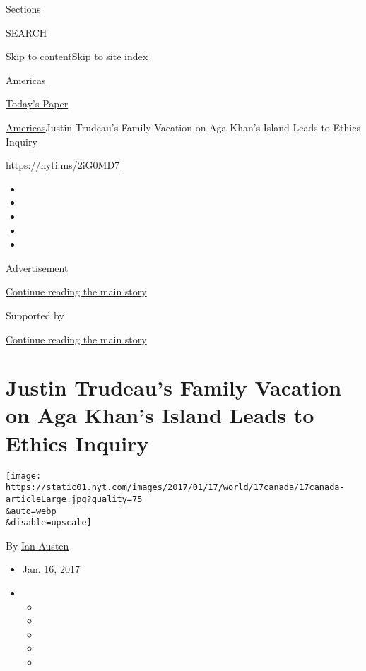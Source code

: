 Sections

SEARCH

\protect\hyperlink{site-content}{Skip to
content}\protect\hyperlink{site-index}{Skip to site index}

\href{https://www.nytimes.com/section/world/americas}{Americas}

\href{https://myaccount.nytimes.com/auth/login?response_type=cookie\&client_id=vi}{}

\href{https://www.nytimes.com/section/todayspaper}{Today's Paper}

\href{/section/world/americas}{Americas}\textbar{}Justin Trudeau's
Family Vacation on Aga Khan's Island Leads to Ethics Inquiry

\url{https://nyti.ms/2iG0MD7}

\begin{itemize}
\item
\item
\item
\item
\item
\end{itemize}

Advertisement

\protect\hyperlink{after-top}{Continue reading the main story}

Supported by

\protect\hyperlink{after-sponsor}{Continue reading the main story}

\hypertarget{justin-trudeaus-family-vacation-on-aga-khans-island-leads-to-ethics-inquiry}{%
\section{Justin Trudeau's Family Vacation on Aga Khan's Island Leads to
Ethics
Inquiry}\label{justin-trudeaus-family-vacation-on-aga-khans-island-leads-to-ethics-inquiry}}

\texttt{[image: https://static01.nyt.com/images/2017/01/17/world/17canada/17canada-articleLarge.jpg?quality=75\\\&auto=webp\\\&disable=upscale]}

By \href{http://www.nytimes.com/by/ian-austen}{Ian Austen}

\begin{itemize}
\item
  Jan. 16, 2017
\item
  \begin{itemize}
  \item
  \item
  \item
  \item
  \item
  \end{itemize}
\end{itemize}

